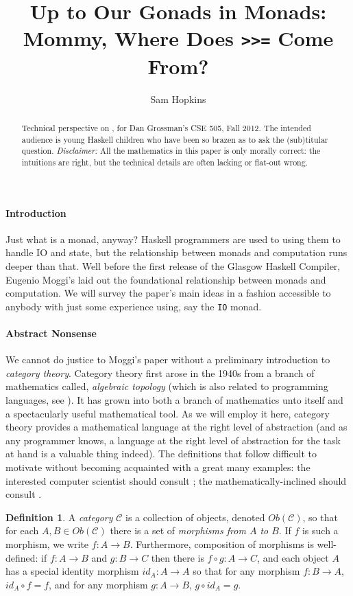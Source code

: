 \documentclass{article}
\title{Up to Our Gonads in Monads: Mommy, Where Does \texttt{>>=} Come From?}
\author{Sam Hopkins}
\renewcommand{\[}{\begin{eqnarray*}}
\renewcommand{\]}{\end{eqnarray*}}
\theoremstyle{definition}
\newtheorem*{defnnonum}{Definition}
\begin{document}
\fancyheadoffset[LE,RO]{0pt}{\marginparsep + \marginparwidth}
\maketitle
\begin{abstract}
  Technical perspective on \cite{moggi89}, for Dan Grossman's CSE 505, Fall
  2012. The intended audience is young Haskell children who have been so brazen
  as to ask the (sub)titular question.
  \emph{Disclaimer:} All the mathematics in this paper is
  only morally correct: the intuitions are right,
  but the technical details are often lacking or flat-out wrong.
\end{abstract}

\paragraph{Introduction} Just what is a monad, anyway? Haskell programmers are
used to using them to handle IO and state, but the relationship between monads
and computation runs deeper than that. Well before the first release of the
Glasgow Haskell Compiler, Eugenio Moggi's \cite{moggi89} laid out the
foundational relationship between monads and computation. We will survey the
paper's main ideas in a fashion accessible to anybody with just some experience
using, say the \texttt{IO} monad.

\paragraph{Abstract Nonsense} We cannot do justice to Moggi's paper
without a preliminary introduction to \emph{category theory}.  Category theory
first arose in the 1940s from a branch of mathematics called, \emph{algebraic
topology} (which is also related to programming languages, see \cite{htt}). It
has grown into both a branch of mathematics unto itself and a spectacularly
useful mathematical tool. As we will employ it here, category theory provides a
mathematical language at the right level of abstraction (and as any programmer
knows, a language at the right level of abstraction for the task at hand is a
valuable thing indeed). The definitions that follow difficult to
motivate without becoming acquainted with a great many examples: the interested
computer scientist should consult \cite{pierce1991}; the
mathematically-inclined should consult \cite{mac1998}.  
\begin{defnnonum}
  A \emph{category} $\mathcal C$ is a collection of objects, denoted
  $Ob(\mathcal C)$, so that for each $A,B \in Ob(\mathcal C)$ there is a set of
  \emph{morphisms from $A$ to $B$}. If $f$ is such a morphism, we write $f: A
  \rightarrow B$. Furthermore, composition of morphisms is well-defined: if $f:A
  \rightarrow B$ and $g : B \rightarrow C$ then there is $f \circ g : A
  \rightarrow C$, and each object $A$ has a special identity morphism $id_A : A
  \rightarrow A$ so that for any morphism $f: B \rightarrow A$, $id_A \circ f =
  f$, and for any morphism $g: A \rightarrow B$, $g \circ id_A = g$.
\end{defnnonum}
\end{document}
